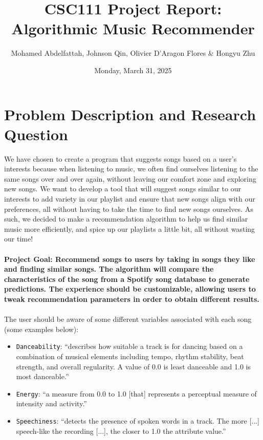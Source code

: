\documentclass[fontsize=11pt]{article}
\title{CSC111 Project Report: Algorithmic Music Recommender}
\author{Mohamed Abdelfattah, Johnson Qin, Olivier D'Aragon Flores \& Hongyu Zhu}
\date{Monday, March 31, 2025}
\begin{document}
\maketitle

\section*{Problem Description and Research Question}

We have chosen to create a program that suggests songs based on a user’s interests because when listening to music, we often find ourselves listening to the same songs over and over again, without leaving our comfort zone and exploring new songs. We want to develop a tool that will suggest songs similar to our interests to add variety in our playlist and ensure that new songs align with our preferences, all without having to take the time to find new songs ourselves. As such, we decided to make a recommendation algorithm to help us find similar music more efficiently, and spice up our playlists a little bit, all without wasting our time! \\
\\ \textbf{Project Goal: Recommend songs to users by taking in songs they like and finding similar songs. The algorithm will compare the characteristics of the song from a Spotify song database to generate predictions. The experience should be customizable, allowing users to tweak recommendation parameters in order to obtain different results.}\\ 
\\ The user should be aware of some different variables associated with each song (some examples below):
\begin{itemize}
    \item \texttt{Danceability}: “describes how suitable a track is for dancing based on a combination of musical elements including tempo, rhythm stability, beat strength, and overall regularity. A value of 0.0 is least danceable and 1.0 is most danceable.”
    \item \texttt{Energy}: “a measure from 0.0 to 1.0 [that] represents a perceptual measure of intensity and activity.”
    \item \texttt{Speechiness}: “detects the presence of spoken words in a track. The more [...] speech-like the recording [...], the closer to 1.0 the attribute value.” 
\end{itemize}
\end{document}
